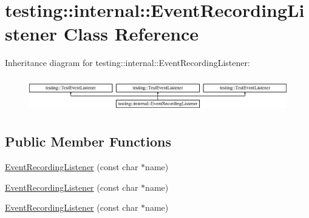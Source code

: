 \hypertarget{classtesting_1_1internal_1_1_event_recording_listener}{}\section{testing\+::internal\+::Event\+Recording\+Listener Class Reference}
\label{classtesting_1_1internal_1_1_event_recording_listener}
Inheritance diagram for testing\+::internal\+::Event\+Recording\+Listener\+:\begin{figure}[H]
\begin{center}
\leavevmode
\includegraphics[height=1.523810cm]{de/dc0/classtesting_1_1internal_1_1_event_recording_listener}
\end{center}
\end{figure}
\subsection*{Public Member Functions}
\begin{DoxyCompactItemize}
\item 
\mbox{\hyperlink{classtesting_1_1internal_1_1_event_recording_listener_a7b0254c15d6b8468e1441ee572fee707}{Event\+Recording\+Listener}} (const char $\ast$name)
\item 
\mbox{\hyperlink{classtesting_1_1internal_1_1_event_recording_listener_a7b0254c15d6b8468e1441ee572fee707}{Event\+Recording\+Listener}} (const char $\ast$name)
\item 
\mbox{\hyperlink{classtesting_1_1internal_1_1_event_recording_listener_a7b0254c15d6b8468e1441ee572fee707}{Event\+Recording\+Listener}} (const char $\ast$name)
\end{DoxyCompactItemize}
